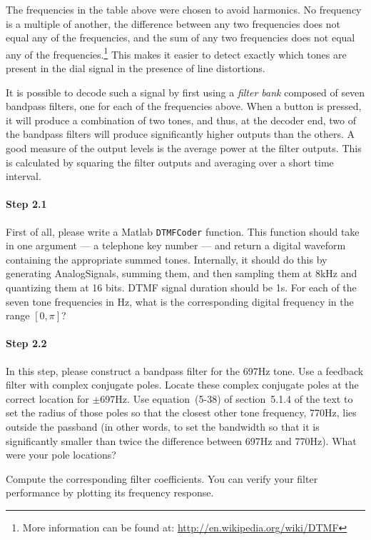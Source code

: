 The frequencies in the table above were chosen to avoid harmonics. No
frequency is a multiple of another, the difference between any two
frequencies does not equal any of the frequencies, and the sum of any
two frequencies does not equal any of the frequencies.\footnote{More
  information can be found at:
  \url{http://en.wikipedia.org/wiki/DTMF}} This makes it easier to
detect exactly which tones are present in the dial signal in the
presence of line distortions.

It is possible to decode such a signal by first using a \emph{filter
  bank} composed of seven bandpass filters, one for each of the
frequencies above. When a button is pressed, it will produce a
combination of two tones, and thus, at the decoder end, two of the
bandpass filters will produce significantly higher outputs than the
others. A good measure of the output levels is the average power at
the filter outputs. This is calculated by squaring the filter outputs
and averaging over a short time interval.

\paragraph{Step 2.1} First of all, please write a Matlab
\verb|DTMFCoder| function. This function should take in one argument
--- a telephone key number --- and return a digital waveform
containing the appropriate summed tones. Internally, it should do this
by generating AnalogSignals, summing them, and then sampling them at
8kHz and quantizing them at 16 bits. DTMF signal duration should be
1s. For each of the seven tone frequencies in Hz, what is the
corresponding digital frequency in the range $[0, \pi]$?

\paragraph{Step 2.2} In this step, please construct a bandpass filter
for the 697Hz tone. Use a feedback filter with complex conjugate
poles. Locate these complex conjugate poles at the correct location
for $\pm$697Hz. Use equation~(5-38) of section~5.1.4 of the text to
set the radius of those poles so that the closest other tone
frequency, 770Hz, lies outside the passband (in other words, to set
the bandwidth so that it is significantly smaller than twice the
difference between 697Hz and 770Hz). What were your pole locations?

Compute the corresponding filter coefficients. You can verify your
filter performance by plotting its frequency response.

